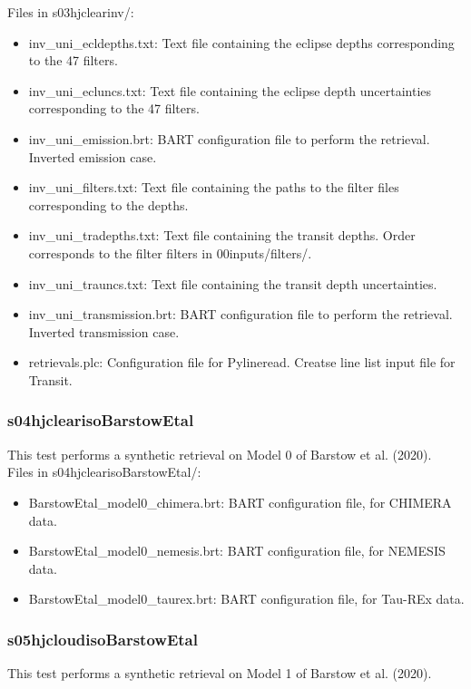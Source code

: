 \documentclass[letterpaper, 12pt]{article}
\begin{document}
Files in s03hjclearinv/:
\begin{itemize} \itemsep0pt
  \item inv{\_}uni{\_}ecldepths.txt: Text file containing the eclipse depths 
        corresponding to the 47 filters.
  \item inv{\_}uni{\_}ecluncs.txt: Text file containing the eclipse depth 
        uncertainties corresponding to the 47 filters.
  \item inv{\_}uni{\_}emission.brt: BART configuration file to perform the retrieval. 
        Inverted emission case.
  \item inv{\_}uni{\_}filters.txt: Text file containing the paths to the filter files corresponding to the depths.
  \item inv{\_}uni{\_}tradepths.txt: Text file containing the transit depths. Order 
        corresponds to the filter filters in 00inputs/filters/.
  \item inv{\_}uni{\_}trauncs.txt: Text file containing the transit depth 
        uncertainties. 
  \item inv{\_}uni{\_}transmission.brt: BART configuration file to perform the 
        retrieval. Inverted transmission case.
  \item retrievals.plc: Configuration file for Pylineread. Creatse line list input file for Transit.
\end{itemize}

\subsubsection{s04hjclearisoBarstowEtal}
\label{sec:ret-barstow-clear}
This test performs a synthetic retrieval on Model 0 of Barstow et al. (2020).\\

Files in s04hjclearisoBarstowEtal/:
\begin{itemize} \itemsep0pt
  \item BarstowEtal{\_}model0{\_}chimera.brt: BART configuration file, for CHIMERA data.
  \item BarstowEtal{\_}model0{\_}nemesis.brt: BART configuration file, for NEMESIS data.
  \item BarstowEtal{\_}model0{\_}taurex.brt:  BART configuration file, for Tau-REx data.
\end{itemize}

\subsubsection{s05hjcloudisoBarstowEtal}
\label{sec:ret-barstow-cloud}
This test performs a synthetic retrieval on Model 1 of Barstow et al. (2020).\\
\end{document}
